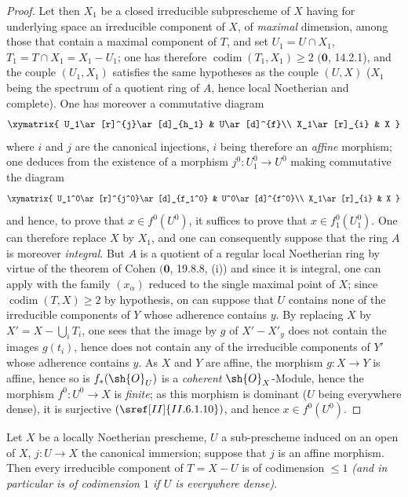 \begin{proof}
Let then $X_1$ be a closed irreducible subprescheme of $X$ having for underlying space an irreducible component of $X$, of \emph{maximal} dimension, among those that contain a maximal component of $T$, and set $U_1=U\cap X_1$, $T_1=T\cap X_1=X_1-U_1$;
one has therefore $\operatorname{codim}(T_1,X_1)\geq 2$ $(\mathbf{0}$, 14.2.1), and the couple $(U_1,X_1)$ satisfies the same hypotheses as the couple $(U,X)$ ($X_1$ being the spectrum of a quotient ring of $A$, hence local Noetherian and complete).
One has moreover a commutative diagram
\[
  \xymatrix{
    U_1\ar[r]^{j}\ar[d]_{h_1} & U\ar[d]^{f}\\
    X_1\ar[r]_{i} & X
  }
\]
where $i$ and $j$ are the canonical injections, $i$ being therefore an \emph{affine} morphism;
one deduces from  the existence of a morphism $j^0:U_1^0\to U^0$ making commutative the diagram
\[
  \xymatrix{
    U_1^0\ar[r]^{j^0}\ar[d]_{f_1^0} & U^0\ar[d]^{f^0}\\
    X_1\ar[r]_{i} & X
  }
\]
and hence, to prove that $x\in f^0(U^0)$, it suffices to prove that $x\in f_1^0(U_1^0)$.
One can therefore replace $X$ by $X_1$, and one can consequently suppose that the ring $A$ is moreover \emph{integral}.
But $A$ is a quotient of a regular local Noetherian ring by virtue of the theorem of Cohen $(\mathbf{0}$, 19.8.8, (i)) and since it is integral, one can apply  with the family $(x_\alpha)$ reduced to the single maximal point of $X$;
since $\operatorname{codim}(T,X)\geq 2$ by hypothesis, on can suppose that $U$ contains none of the irreducible components of $Y$ whose adherence contains $y$.
By replacing $X$ by $X'=X-\bigcup_i T_i$, one sees that the image by $g$ of $X'-X'_y$ does not contain the images $g(t_i)$, hence does not contain any of the irreducible components of $Y'$ whose adherence contains $y$.
As $X$ and $Y$ are affine, the morphism $g:X\to Y$ is affine, hence so is $f_*(\sh{O}_U)$ is a \emph{coherent} $\sh{O}_X$-Module, hence the morphism $f^0:U^0\to X$ is \emph{finite};
as this morphism is dominant ($U$ being everywhere dense), it is surjective $(\sref[II]{II.6.1.10})$, and hence $x\in f^0(U^0)$.
\end{proof}

\begin{corollary}[21.12.7]
\label{IV.21.12.7}
Let $X$ be a locally Noetherian prescheme, $U$ a sub-prescheme induced on an open of $X$, $j:U\to X$ the canonical immersion; suppose that $j$ is an affine morphism.
Then every irreducible component of $T=X-U$ is of codimension $\leq 1$ \emph{(and in particular is of codimension $1$ if $U$ is everywhere dense)}.
\end{corollary}

